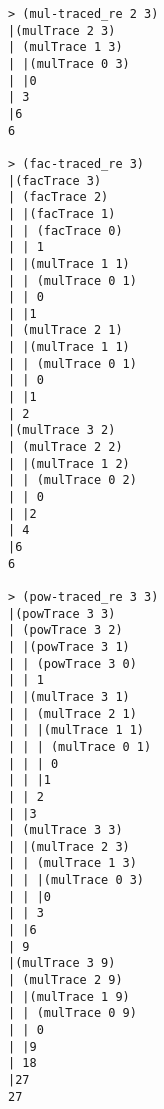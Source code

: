 \begin{verbatim}
> (mul-traced_re 2 3)
|(mulTrace 2 3)
| (mulTrace 1 3)
| |(mulTrace 0 3)
| |0
| 3
|6
6

> (fac-traced_re 3)
|(facTrace 3)
| (facTrace 2)
| |(facTrace 1)
| | (facTrace 0)
| | 1
| |(mulTrace 1 1)
| | (mulTrace 0 1)
| | 0
| |1
| (mulTrace 2 1)
| |(mulTrace 1 1)
| | (mulTrace 0 1)
| | 0
| |1
| 2
|(mulTrace 3 2)
| (mulTrace 2 2)
| |(mulTrace 1 2)
| | (mulTrace 0 2)
| | 0
| |2
| 4
|6
6

> (pow-traced_re 3 3)
|(powTrace 3 3)
| (powTrace 3 2)
| |(powTrace 3 1)
| | (powTrace 3 0)
| | 1
| |(mulTrace 3 1)
| | (mulTrace 2 1)
| | |(mulTrace 1 1)
| | | (mulTrace 0 1)
| | | 0
| | |1
| | 2
| |3
| (mulTrace 3 3)
| |(mulTrace 2 3)
| | (mulTrace 1 3)
| | |(mulTrace 0 3)
| | |0
| | 3
| |6
| 9
|(mulTrace 3 9)
| (mulTrace 2 9)
| |(mulTrace 1 9)
| | (mulTrace 0 9)
| | 0
| |9
| 18
|27
27
\end{verbatim}
